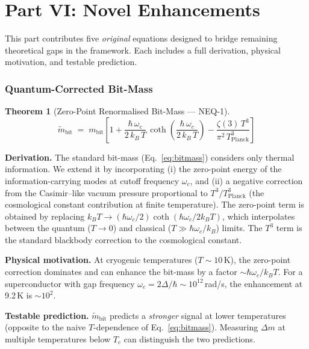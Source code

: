 \documentclass[11pt,a4paper]{article}
\newtheorem{theorem}{Theorem}[section]
\theoremstyle{remark}
\begin{document}
\part{Part VI: Novel Enhancements}
\label{part:novel}

This part contributes five \emph{original} equations designed to bridge remaining theoretical gaps in the framework.  Each includes a full derivation, physical motivation, and testable prediction.

\section{Quantum-Corrected Bit-Mass}
\label{sec:novel1}

\begin{theorem}[Zero-Point Renormalised Bit-Mass --- NEQ-1]
\begin{equation}\label{eq:novel1}
    \tilde{m}_{\text{bit}} \;=\; m_{\text{bit}}\left[
        1 + \frac{\hbar\,\omega_c}{2\,k_B\,T}\,
        \coth\!\left(\frac{\hbar\,\omega_c}{2\,k_B\,T}\right)
        - \frac{\zeta(3)\,T^3}{\pi^2\, T_{\text{Planck}}^3}
    \right]
\end{equation}
\end{theorem}

\textbf{Derivation.}\quad
The standard bit-mass (Eq.~\eqref{eq:bitmass}) considers only thermal information.  We extend it by incorporating (i) the zero-point energy of the information-carrying modes at cutoff frequency $\omega_c$, and (ii) a negative correction from the Casimir--like vacuum pressure proportional to $T^3/T_{\text{Planck}}^3$ (the cosmological constant contribution at finite temperature).  The zero-point term is obtained by replacing $k_B T \to (\hbar\omega_c/2)\coth(\hbar\omega_c/2k_BT)$, which interpolates between the quantum ($T \to 0$) and classical ($T \gg \hbar\omega_c/k_B$) limits.  The $T^3$ term is the standard blackbody correction to the cosmological constant.

\textbf{Physical motivation.}\quad
At cryogenic temperatures ($T \sim 10$\,K), the zero-point correction dominates and can enhance the bit-mass by a factor $\sim \hbar\omega_c / k_B T$.  For a superconductor with gap frequency $\omega_c = 2\Delta/\hbar \sim 10^{12}$\,rad/s, the enhancement at 9.2\,K is $\sim 10^2$.

\textbf{Testable prediction.}\quad
$\tilde{m}_{\text{bit}}$ predicts a \emph{stronger} signal at lower temperatures (opposite to the naive $T$-dependence of Eq.~\eqref{eq:bitmass}).  Measuring $\Delta m$ at multiple temperatures below $T_c$ can distinguish the two predictions.
\end{document}
